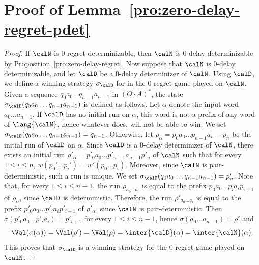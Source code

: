 \documentclass[a4paper]{article}
\begin{document}
\section{Proof of Lemma~\ref{pro:zero-delay-regret-pdet}}
\begin{proof}
	If $\calN$ is $0$-regret determinizable, then $\calN$ is $0$-delay
	determinizable by Proposition~\ref{pro:zero-delay-regret}. Now suppose
	that $\calN$ is $0$-delay determinizable, and let $\calD$ be a $0$-delay
	determinizer of $\calN$. Using $\calD$, we define a winning strategy
	$\sigma_{\calD}$ for \eve in the $0$-regret game played on $\calN$.
	Given a sequence $q_0 a_0 \ldots q_{n-1} a_{n-1}$ in $(Q \cdot A)^*$,
	the state $\sigma_{\calD}(q_0 a_0 \ldots q_{n-1} a_{n-1})$ is defined as
	follows. Let $\alpha$ denote the input word $a_0 \ldots a_{n-1}$.  If
	$\calD$ has no initial run on $\alpha$, this word is not a prefix of any
	word of $\lang{\calN}$, hence whatever \eve does, \adam will not be able
	to win.  We set $\sigma_{\calD}(q_0 a_0 \ldots q_{n-1} a_{n-1}) =
	q_{n-1}$.  Otherwise, let $\rho_{\alpha} = p_0 a_0 \ldots p_{n-1}
	a_{n-1} p_{n}$ be the initial run of $\calD$ on $\alpha$. Since $\calD$
	is a $0$-delay determinizer of $\calN$, there exists an initial run
	$\rho'_{\alpha} = p'_0 a_0 \ldots p'_{n-1} a_{n-1} p'_{n}$ of $\calN$
	such that for every $1 \leq i \leq n$, $w(p_0' \dots p_i') = w'(p_0
	\dots p_i)$.  Moreover, since $\calN$ is pair-deterministic,
	such a run is unique.  We set $\sigma_{\calD}(q_0 a_0 \ldots q_{n-1}
	a_{n-1}) = p'_{n}$.  Note that, for every $1 \leq i \leq n-1$, the run
	$\rho_{a_0 \ldots a_i}$ is equal to the prefix $p_0 a_0 \ldots p_{i}
	a_{i} p_{i+1}$ of $\rho_{\alpha}$, since $\calD$ is deterministic.
	Therefore, the run $\rho'_{a_0 \ldots a_i}$ is equal to the prefix $p'_0
	a_0 \ldots p'_{i} a_{i} p'_{i+1}$ of $\rho'_{\alpha}$, since $\calN$ is
	pair-deterministic.  Then $\sigma(p'_0 a_0 \ldots p'_{i} a_{i}) =
	p'_{i+1}$ for every $1 \leq i \leq n-1$, hence $\sigma(a_0 \ldots
	a_{n-1}) = \rho'$ and	
	\[
		\Val(\sigma(\alpha)) = \Val(\rho') = \Val(\rho) =
		\inter{\calD}(\alpha) = \inter{\calN}(\alpha).
	\]
	This proves that $\sigma_{\calD}$ is a winning strategy for the
	$0$-regret game played on $\calN$.
\end{proof}
\end{document}
